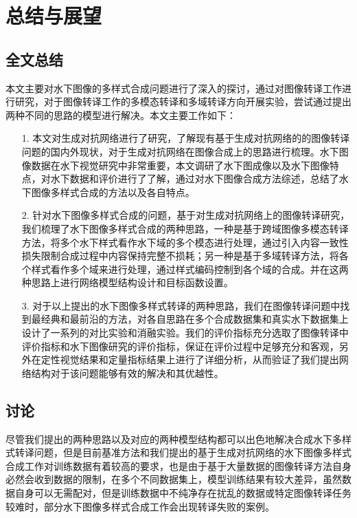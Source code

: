 \chapter{总结与展望}
\section{全文总结}
本文主要对水下图像的多样式合成问题进行了深入的探讨，通过对图像转译工作进行研究，对于图像转译工作的多模态转译和多域转译方向开展实验，尝试通过提出两种不同的思路的模型进行解决。本文主要工作如下：

\begin{itemize}
	\item [1.]
	本文对生成对抗网络进行了研究，了解现有基于生成对抗网络的的图像转译问题的国内外现状，对于生成对抗网络在图像合成上的思路进行梳理。水下图像数据在水下视觉研究中非常重要，本文调研了水下图成像以及水下图像特点，对水下数据和评价进行了了解，通过对水下图像合成方法综述，总结了水下图像多样式合成的方法以及各自特点。
	
	\item [2.]
	针对水下图像多样式合成的问题，基于对生成对抗网络上的图像转译研究，我们梳理了水下图像多样式合成的两种思路，一种是基于跨域图像多模态转译方法，将多个水下样式看作水下域的多个模态进行处理，通过引入内容一致性损失限制合成过程中内容保持完整不损耗；另一种是基于多域转译方法，将各个样式看作多个域来进行处理，通过样式编码控制到各个域的合成。并在这两种思路上进行网络模型结构设计和目标函数设置。

	\item [3.]
	对于以上提出的水下图像多样式转译的两种思路，我们在图像转译问题中找到最经典和最前沿的方法，对各自思路在多个合成数据集和真实水下数据集上设计了一系列的对比实验和消融实验。我们的评价指标充分选取了图像转译中评价指标和水下图像研究的评价指标，保证在评价过程中足够充分和客观，另外在定性视觉结果和定量指标结果上进行了详细分析，从而验证了我们提出网络结构对于该问题能够有效的解决和其优越性。

\end{itemize}

\section{讨论}
尽管我们提出的两种思路以及对应的两种模型结构都可以出色地解决合成水下多样式转译问题，但是目前基准方法和我们提出的基于生成对抗网络的水下图像多样式合成工作对训练数据有着较高的要求，也是由于基于大量数据的图像转译方法自身必然会收到数据的限制，在多个不同数据集上，模型训练结果有较大差异，虽然数据自身可以无需配对，但是训练数据中不纯净存在扰乱的数据或特定图像转译任务较难时，部分水下图像多样式合成工作会出现转译失败的案例。



